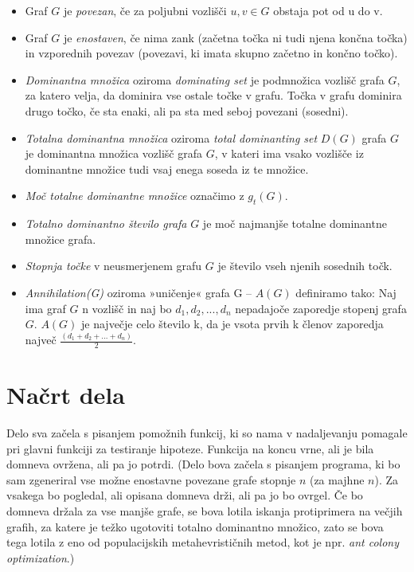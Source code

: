 \documentclass[11pt, a4paper]{article}
\begin{document}
\begin{itemize}
 	\item Graf $G$ je \textit{povezan}, če za poljubni vozlišči $u,v \in G$ obstaja pot od u do v.
	\item Graf $G$ je \textit{enostaven}, če nima zank (začetna točka ni tudi njena končna točka) in vzporednih povezav (povezavi, ki imata skupno začetno in končno točko). 
	\item \textit{Dominantna množica} oziroma \textit{dominating set} je podmnožica vozlišč grafa $G$, za katero velja, da dominira vse ostale točke v grafu.  Točka v grafu dominira drugo točko, če sta enaki, ali pa sta med seboj povezani (sosedni). 
           \item \textit{Totalna dominantna množica} oziroma \textit{total dominanting set} $D(G)$ grafa $G$ je dominantna množica vozlišč grafa $G$, v kateri ima vsako vozlišče iz dominantne množice tudi vsaj enega soseda iz te množice.
           \item \textit{Moč totalne dominantne množice} označimo z  $g_t (G)$.
           \item \textit{Totalno dominantno število grafa} $G$ je moč najmanjše totalne dominantne množice grafa. 
           \item \textit{Stopnja točke} v neusmerjenem grafu $G$ je število vseh njenih sosednih točk.
           \item \textit{Annihilation(G)} oziroma »uničenje« grafa G – $A(G)$ definiramo tako: Naj ima graf $G$ n vozlišč in naj bo $d_1,d_2, ...,d_n$ nepadajoče zaporedje stopenj grafa $G$. $A(G)$ je največje celo število k, da je vsota prvih k členov zaporedja največ  $\frac{(d_1 + d_2+ ... + d_n)}{2}$.

\end{itemize}

\section{\textbf{Načrt dela}}

Delo sva začela s pisanjem pomožnih funkcij, ki so nama v nadaljevanju pomagale pri glavni funkciji za testiranje hipoteze. Funkcija na koncu vrne, ali je bila domneva ovržena, ali pa jo potrdi. (Delo bova začela s pisanjem programa, ki bo sam zgeneriral vse možne enostavne povezane grafe stopnje $n$ (za majhne $n$). Za vsakega bo pogledal, ali opisana domneva drži, ali pa jo bo ovrgel. Če bo domneva držala za vse manjše grafe, se bova lotila iskanja protiprimera na večjih grafih, za katere je težko ugotoviti totalno dominantno množico, zato se bova tega lotila z eno od populacijskih metahevrističnih metod, kot je npr. \textit{ant colony optimization}.) 
\end{document}
